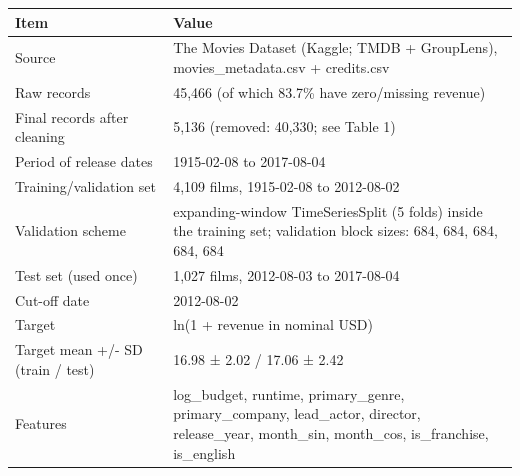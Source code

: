 \begin{tabular}{ll}
\toprule
Item & Value \\
\midrule
Source & The Movies Dataset (Kaggle; TMDB + GroupLens), movies\_metadata.csv + credits.csv \\
Raw records & 45,466 (of which 83.7\% have zero/missing revenue) \\
Final records after cleaning & 5,136  (removed: 40,330; see Table 1) \\
Period of release dates & 1915-02-08 to 2017-08-04 \\
Training/validation set & 4,109 films, 1915-02-08 to 2012-08-02 \\
Validation scheme & expanding-window TimeSeriesSplit (5 folds) inside the training set; validation block sizes: 684, 684, 684, 684, 684 \\
Test set (used once) & 1,027 films, 2012-08-03 to 2017-08-04 \\
Cut-off date & 2012-08-02 \\
Target & ln(1 + revenue in nominal USD) \\
Target mean +/- SD (train / test) & 16.98 ± 2.02 / 17.06 ± 2.42 \\
Features & log\_budget, runtime, primary\_genre, primary\_company, lead\_actor, director, release\_year, month\_sin, month\_cos, is\_franchise, is\_english \\
\bottomrule
\end{tabular}
